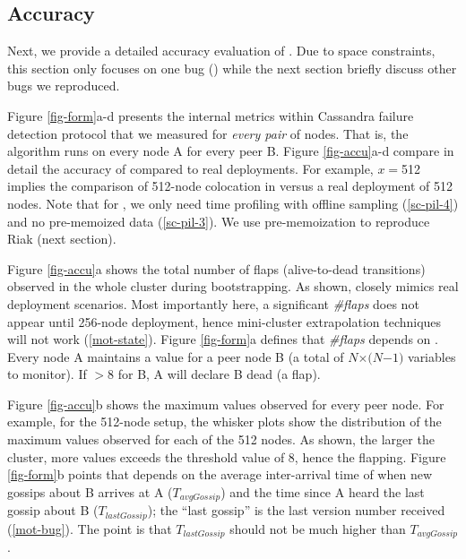 
\subsection{Accuracy}
\label{eval-accu}

\def \fff        {$f$}
\def \flaps      {\textit{\#flaps}\xspace}
\def \gosLast    {$T_{lastGossip}$\xspace}
\def \gosAvg     {$T_{avgGossip}$\xspace}
\def \gosProc    {$T_{gossipExec}$\xspace}
\def \supProc    {$T_{stateUpdate}$\xspace}
\def \hops       {\textit{\#hops}\xspace}

\def \ringTable  {$Size_{ringTable}$\xspace}
\def \newStates  {$Size_{newStates}$\xspace}
\def \cpuSpeed   {$CPU$\xspace}

Next, we provide a detailed accuracy evaluation of \sck.  Due to space
constraints, this section only focuses on one bug (\caone \cite{CA-One}) 
while the next
section briefly discuss other bugs we reproduced.



Figure \ref{fig-form}a-d presents the  internal metrics within
Cassandra failure detection protocol that we measured for {\em every pair}
of nodes.  That is, the algorithm runs on every node A for every peer B.
%
Figure \ref{fig-accu}a-d compare in detail the accuracy of \sck compared
to real deployments.
%
For example, $x$$=$512 implies the comparison of 512-node colocation in
\sck versus a real deployment of 512 nodes.
%
Note that for \caone, we only need time profiling with offline sampling
(\sec\ref{sc-pil-4}) and no pre-memoized data (\sec\ref{sc-pil-3}).  
%
We use pre-memoization to reproduce Riak \riakone (next section).

Figure \ref{fig-accu}a shows the total number of flaps (alive-to-dead
transitions) observed in the whole cluster during bootstrapping.  
As shown, \sck closely mimics
real deployment scenarios.  Most importantly here, a significant \flaps
does not appear until 256-node deployment, 
hence mini-cluster extrapolation techniques will not work (\sec\ref{mot-state}).
%
Figure \ref{fig-form}a defines that \flaps depends on 
\phi \cite{Hayashibara+04-PhiFailureDetector}.  Every node A
maintains a \phi value for a peer node B (a total of $N$$\times$$(N$$-$$1)$
variables to monitor).  If \phi$>$8 for B, A will declare B dead (a flap).

Figure \ref{fig-accu}b shows the maximum \phi values observed for every
peer node.  For example, for the 512-node setup, the whisker plots show the
distribution of the maximum \phi values observed for each of the 512
nodes.  As shown, the larger the cluster, more \phi values exceeds the
threshold value of 8, hence the flapping.
%
Figure \ref{fig-form}b points that \phi depends on the average
inter-arrival time of when new gossips about B arrives at A (\gosAvg) and the
time since A heard the last gossip about B (\gosLast); the ``last gossip''
is the last version number received (\sec\ref{mot-bug}).  The point is that
\gosLast should not be much higher than \gosAvg.

